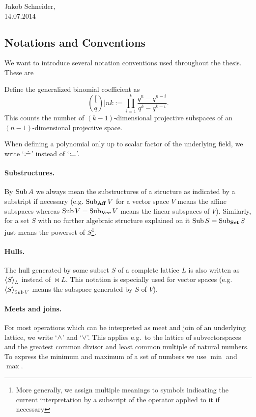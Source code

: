 \begin{flushright}
    Jakob Schneider,\\
    14.07.2014
\end{flushright}

\subsection*{Notations and Conventions}\label{not-conv}

We want to introduce several notation conventions used throughout the thesis.
These are 
\begin{definition}
    Define the generalized binomial coefficient as
    $$
    \binom[q]{n}{k}:= \prod_{i=1}^{k}{\frac{q^n-q^{n-i}}{q^k-q^{k-i}}}.
    $$
    This counts the number of $(k-1)$-dimensional projective subspaces of an $(n-1)$-dimensional projective space.
\end{definition}

When defining a polynomial only up to scalar factor of the underlying field, we write `$\mathrel{\mathrel{\mathop:}\mkern-1.2mu\doteq}$' instead of `$\mathrel{\mathrel{\mathop:}\mkern-1.2mu=}$'.
%
\paragraph{Substructures.} By $\mathop{\mathrm{Sub}}\nolimits A$ we always mean the substructures of a structure as indicated by a substript if necessary (e.g. $\mathop{\mathrm{Sub}}\nolimits_{\mathbf{Aff}}V$ for a vector space $V$ means the affine subspaces whereas $\mathop{\mathrm{Sub}}\nolimits V=\mathop{\mathrm{Sub}}\nolimits_{\mathbf{Vec}} V$ means the linear subspaces of $V$). Similarly, for a set $S$ with no further algebraic structure explained on it $\mathop{\mathrm{Sub}}\nolimits S=\mathop{\mathrm{Sub}}\nolimits_{\mathbf{Set}} S$ just means the powerset of $S$\footnote{More generally, we assign multiple meanings to symbols indicating the current interpretation by a subscript of the operator applied to it if necessary}.

\paragraph{Hulls.} The hull generated by some subset $S$ of a complete lattice $L$ is also written as $\gen{S}_L$ instead of $\Join L$. This notation is especially used for vector spaces (e.g.~$\gen{S}_{\Sub V}$ means the subspace generated by $S$ of $V$). 

\paragraph{Meets and joins.} For most operations which can be interpreted as meet and join of an underlying lattice, we write `$\wedge$' and `$\vee$'. This applies e.g.~to the lattice of subvectorspaces and the greatest common divisor and least common multiple of natural numbers.
To express the minimum and maximum of a set of numbers we use $\min$ and $\max$.

